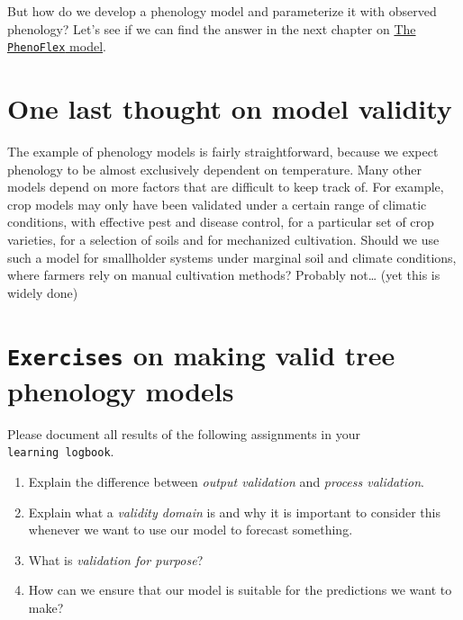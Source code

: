 \documentclass[
]{book}
\providecommand{\tightlist}{%
  \setlength{\itemsep}{0pt}\setlength{\parskip}{0pt}}
\begin{document}
But how do we develop a phenology model and parameterize it with observed phenology? Let's see if we can find the answer in the next chapter on \protect\hyperlink{phenoflex}{The \texttt{PhenoFlex} model}.

\hypertarget{one-last-thought-on-model-validity}{%
\section{One last thought on model validity}\label{one-last-thought-on-model-validity}}

The example of phenology models is fairly straightforward, because we expect phenology to be almost exclusively dependent on temperature. Many other models depend on more factors that are difficult to keep track of. For example, crop models may only have been validated under a certain range of climatic conditions, with effective pest and disease control, for a particular set of crop varieties, for a selection of soils and for mechanized cultivation. Should we use such a model for smallholder systems under marginal soil and climate conditions, where farmers rely on manual cultivation methods? Probably not\ldots{} (yet this is widely done)

\hypertarget{ex_model_validity}{%
\section*{\texorpdfstring{\texttt{Exercises} on making valid tree phenology models}{Exercises on making valid tree phenology models}}\label{ex_model_validity}}

Please document all results of the following assignments in your \texttt{learning\ logbook}.

\begin{enumerate}
\def\labelenumi{\arabic{enumi})}
\tightlist
\item
  Explain the difference between \emph{output validation} and \emph{process validation}.
\item
  Explain what a \emph{validity domain} is and why it is important to consider this whenever we want to use our model to forecast something.
\item
  What is \emph{validation for purpose}?
\item
  How can we ensure that our model is suitable for the predictions we want to make?
\end{enumerate}
\end{document}
